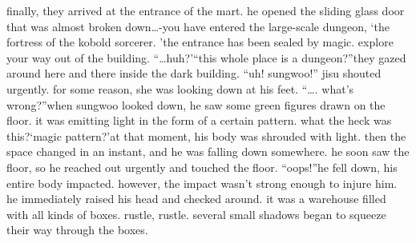 finally, they arrived at the entrance of the mart.
he opened the sliding glass door that was almost broken down…-you have entered the large-scale dungeon, ‘the fortress of the kobold sorcerer.
’the entrance has been sealed by magic.
 explore your way out of the building.
“…huh?’“this whole place is a dungeon?”they gazed around here and there inside the dark building.
“uh! sungwoo!” jisu shouted urgently.
for some reason, she was looking down at his feet.
“….
what’s wrong?”when sungwoo looked down, he saw some green figures drawn on the floor.
 it was emitting light in the form of a certain pattern.
 what the heck was this?‘magic pattern?’at that moment, his body was shrouded with light.
 then the space changed in an instant, and he was falling down somewhere.
 he soon saw the floor, so he reached out urgently and touched the floor.
“oops!”he fell down, his entire body impacted.
 however, the impact wasn’t strong enough to injure him.
he immediately raised his head and checked around.
 it was a warehouse filled with all kinds of boxes.
rustle, rustle.
several small shadows began to squeeze their way through the boxes.

